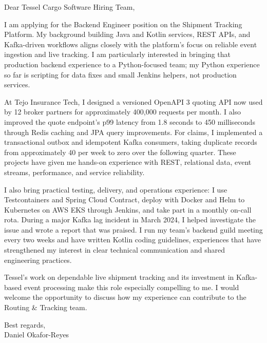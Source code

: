 \documentclass[11pt,a4paper]{article}
\begin{document}
Dear Tessel Cargo Software Hiring Team,

I am applying for the Backend Engineer position on the Shipment Tracking Platform. My background building Java and Kotlin services, REST APIs, and Kafka-driven workflows aligns closely with the platform’s focus on reliable event ingestion and live tracking. I am particularly interested in bringing that production backend experience to a Python-focused team; my Python experience so far is scripting for data fixes and small Jenkins helpers, not production services.

At Tejo Insurance Tech, I designed a versioned OpenAPI 3 quoting API now used by 12 broker partners for approximately 400,000 requests per month. I also improved the quote endpoint’s p99 latency from 1.8 seconds to 450 milliseconds through Redis caching and JPA query improvements. For claims, I implemented a transactional outbox and idempotent Kafka consumers, taking duplicate records from approximately 40 per week to zero over the following quarter. These projects have given me hands-on experience with REST, relational data, event streams, performance, and service reliability.

I also bring practical testing, delivery, and operations experience: I use Testcontainers and Spring Cloud Contract, deploy with Docker and Helm to Kubernetes on AWS EKS through Jenkins, and take part in a monthly on-call rota. During a major Kafka lag incident in March 2024, I helped investigate the issue and wrote a report that was praised. I run my team’s backend guild meeting every two weeks and have written Kotlin coding guidelines, experiences that have strengthened my interest in clear technical communication and shared engineering practices.

Tessel’s work on dependable live shipment tracking and its investment in Kafka-based event processing make this role especially compelling to me. I would welcome the opportunity to discuss how my experience can contribute to the Routing & Tracking team.

Best regards,\\
Daniel Okafor-Reyes
\end{document}
